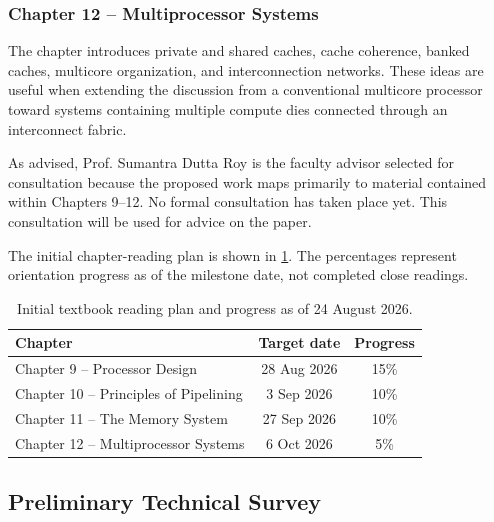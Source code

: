 \documentclass[12pt,a4paper,twoside]{article}
\begin{document}
\subsubsection{Chapter 12 -- Multiprocessor Systems}

The chapter introduces private and shared caches, cache coherence, banked caches, multicore organization, and interconnection networks. These ideas are useful when extending the discussion from a conventional multicore processor toward systems containing multiple compute dies connected through an interconnect fabric.

As advised, Prof. Sumantra Dutta Roy is the faculty advisor selected for consultation because the proposed work maps primarily to material contained within Chapters 9--12. No formal consultation has taken place yet. This consultation will be used for advice on the paper.

The initial chapter-reading plan is shown in \cref{tab:chapter-plan}. The percentages represent orientation progress as of the milestone date, not completed close readings.

\begin{table}[htbp]
  \centering
  \caption{Initial textbook reading plan and progress as of 24 August 2026.}
  \label{tab:chapter-plan}
  \begin{tabular}{p{} c c}
    \toprule
    Chapter & Target date & Progress\\
    \midrule
    Chapter 9 -- Processor Design & 28 Aug 2026 & 15\%\\
    Chapter 10 -- Principles of Pipelining & 3 Sep 2026 & 10\%\\
    Chapter 11 -- The Memory System & 27 Sep 2026 & 10\%\\
    Chapter 12 -- Multiprocessor Systems & 6 Oct 2026 & 5\%\\
    \bottomrule
  \end{tabular}
\end{table}

\FloatBarrier

\subsection{Preliminary Technical Survey}
\label{sec:survey}
\end{document}
